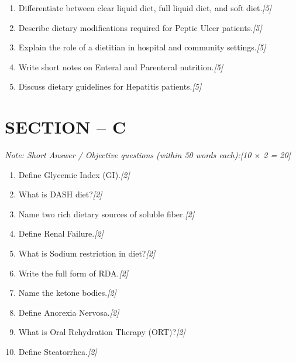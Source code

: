 \documentclass[11pt,a4paper]{article}
\newcommand{\pts}[1]{\hfill \textit{[#1]}}
\begin{document}
\begin{enumerate}[label=\textbf{\arabic*.},leftmargin=*,start=5,itemsep=8pt]

  \item Differentiate between clear liquid diet, full liquid diet, and soft diet.\pts{5}

  \item Describe dietary modifications required for Peptic Ulcer patients.\pts{5}

  \item Explain the role of a dietitian in hospital and community settings.\pts{5}

  \item Write short notes on Enteral and Parenteral nutrition.\pts{5}

  \item Discuss dietary guidelines for Hepatitis patients.\pts{5}

\end{enumerate}

\bigskip

\section*{SECTION -- C}
\noindent \textit{Note: Short Answer / Objective questions (within 50 words each):}\pts{10 $\times$ 2 = 20}

\begin{enumerate}[label=\textbf{10.}(\roman*),leftmargin=*,itemsep=6pt]

  \item Define Glycemic Index (GI).\pts{2}
  \item What is DASH diet?\pts{2}
  \item Name two rich dietary sources of soluble fiber.\pts{2}
  \item Define Renal Failure.\pts{2}
  \item What is Sodium restriction in diet?\pts{2}
  \item Write the full form of RDA.\pts{2}
  \item Name the ketone bodies.\pts{2}
  \item Define Anorexia Nervosa.\pts{2}
  \item What is Oral Rehydration Therapy (ORT)?\pts{2}
  \item Define Steatorrhea.\pts{2}

\end{enumerate}
\end{document}
